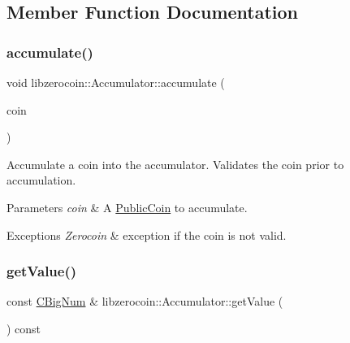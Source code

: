 \subsection{Member Function Documentation}
\mbox{\label{classlibzerocoin_1_1_accumulator_aa58ff4676bd84dea150ae40abd489024}} 
\subsubsection{\texorpdfstring{accumulate()}{accumulate()}}
{\footnotesize\ttfamily void libzerocoin\+::\+Accumulator\+::accumulate (\begin{DoxyParamCaption}\item[{const \mbox{\hyperlink{classlibzerocoin_1_1_public_coin}{Public\+Coin}} \&}]{coin }\end{DoxyParamCaption})}

Accumulate a coin into the accumulator. Validates the coin prior to accumulation.


\begin{DoxyParams}{Parameters}
{\em coin} & A \mbox{\hyperlink{classlibzerocoin_1_1_public_coin}{Public\+Coin}} to accumulate.\\
\hline
\end{DoxyParams}

\begin{DoxyExceptions}{Exceptions}
{\em Zerocoin} & exception if the coin is not valid. \\
\hline
\end{DoxyExceptions}
\mbox{\label{classlibzerocoin_1_1_accumulator_abe9f6281164864e8cd7ca48ad8a7bd18}} 
\subsubsection{\texorpdfstring{get\+Value()}{getValue()}}
{\footnotesize\ttfamily const \mbox{\hyperlink{class_c_big_num}{C\+Big\+Num}} \& libzerocoin\+::\+Accumulator\+::get\+Value (\begin{DoxyParamCaption}{ }\end{DoxyParamCaption}) const}

